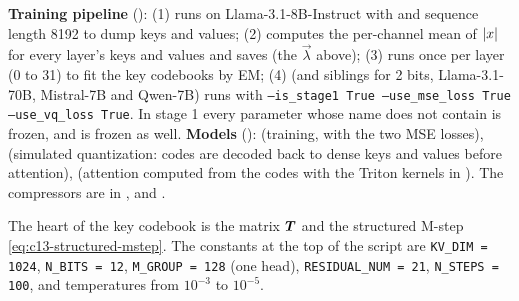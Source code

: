 \begin{implnote}[title={In the code: map of \texttt{repos/UMass-Embodied-AGI\_\_CommVQ}}]
\textbf{Training pipeline} (): (1)
 runs  on Llama-3.1-8B-Instruct with
 and sequence length 8192 to dump keys and values; (2)
 computes the per-channel mean of $\left\lvert x\right\rvert$ for every layer's keys and values and
saves  (the $\vec{\lambda}$ above); (3)  runs
 once per layer (0 to 31) to fit the key codebooks by EM; (4)
 (and siblings for 2 bits, Llama-3.1-70B, Mistral-7B and
Qwen-7B) runs  with \texttt{--is\_stage1 True --use\_mse\_loss True --use\_vq\_loss True}.
In stage 1 every parameter whose name does not contain  is frozen, and
 is frozen as well.
\textbf{Models} (): 
(training, with the two MSE losses),  (simulated quantization:
codes are decoded back to dense keys and values before attention), 
(attention computed from the codes with the Triton kernels in ). The
compressors are in ,  and .
\end{implnote}

The heart of the key codebook is the matrix $\bm{T}$ and the structured M-step
\eqref{eq:c13-structured-mstep}. The constants at the top of the script are \texttt{KV\_DIM = 1024},
\texttt{N\_BITS = 12}, \texttt{M\_GROUP = 128} (one head), \texttt{RESIDUAL\_NUM = 21}, \texttt{N\_STEPS = 100}, and
temperatures from $10^{-3}$ to $10^{-5}$.


